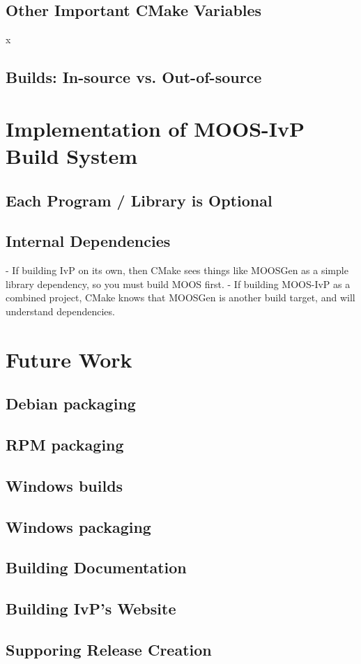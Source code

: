 \documentclass[letterpaper,10pt]{article}
\begin{document}
\subsection{Other Important CMake Variables}
x
\subsection{Builds: In-source vs. Out-of-source}

\section{Implementation of MOOS-IvP Build System }
\subsection{Each Program / Library is Optional}
\subsection{Internal Dependencies}
- If building IvP on its own, then CMake sees things like MOOSGen as
a simple library dependency, so you must build MOOS first.
- If building MOOS-IvP as a combined project, CMake knows that MOOSGen
is another build target, and will understand dependencies.

\section{Future Work}


\subsection{Debian packaging}

\subsection{RPM packaging}

\subsection{Windows builds}

\subsection{Windows packaging}

\subsection{Building Documentation}

\subsection{Building IvP's Website}

\subsection{Supporing Release Creation}
\end{document}
